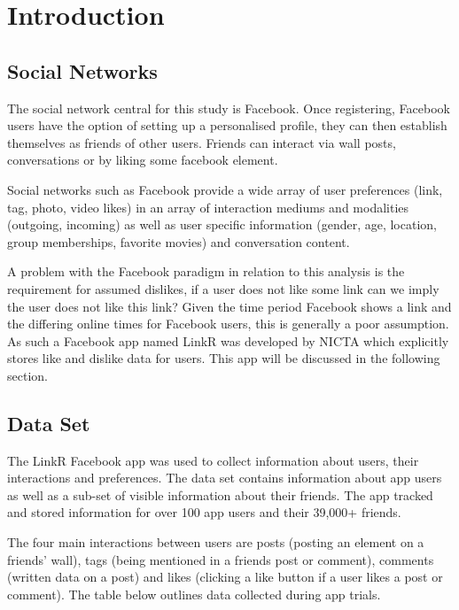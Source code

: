 
\chapter{Introduction}
\label{cha:intro}

\section{Social Networks}
\label{sec:sn}

The social network central for this study is Facebook. Once registering, Facebook users have the option of setting up a personalised profile, they can then establish
 themselves as friends of other users. Friends can interact via wall posts, conversations or by liking some facebook element.

Social networks such as Facebook provide a wide array of user preferences (link, tag, photo, video likes) in an array of interaction mediums and modalities 
(outgoing, incoming) as well as user specific information (gender, age, location, group memberships, favorite movies) and conversation content.

A problem with the Facebook paradigm in relation to this analysis is the requirement for assumed dislikes, if a user does not like some link can we 
imply the user does not like this link? Given the time period Facebook shows a link and the differing online times for Facebook users, this is generally 
a poor assumption. As such a Facebook app named LinkR was developed by NICTA which explicitly stores like and dislike data for users. This app will 
be discussed in the following section.

\section{Data Set}
\label{sec:data}

The LinkR Facebook app was used to collect information about users, their interactions and preferences. The data set contains information about app users as 
well as a sub-set of visible information about their friends. The app tracked and stored information for over 100 app users and their 39,000+ friends.

The four main interactions between users are posts (posting an element on a friends' wall), tags (being mentioned in a friends post or comment), 
 comments (written data on a post) and likes (clicking a like button if a user likes a post or comment). The table below outlines data collected during 
 app trials.

